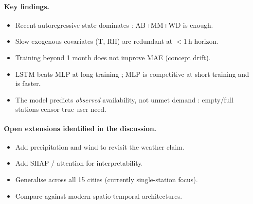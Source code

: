 \documentclass[a4paper,twoside]{article}
\begin{document}
\paragraph{Key findings.}
\begin{itemize}
\item Recent autoregressive state dominates : AB+MM+WD is enough.
\item Slow exogenous covariates (T, RH) are redundant at $<1$\,h horizon.
\item Training beyond 1 month does not improve MAE (concept drift).
\item LSTM beats MLP at long training ; MLP is competitive at short
training and is faster.
\item The model predicts \emph{observed} availability, not unmet
demand : empty/full stations censor true user need.
\end{itemize}

\paragraph{Open extensions identified in the discussion.}
\begin{itemize}
\item Add precipitation and wind to revisit the weather claim.
\item Add SHAP / attention for interpretability.
\item Generalise across all 15 cities (currently single-station focus).
\item Compare against modern spatio-temporal architectures.
\end{itemize}

\end{document}
